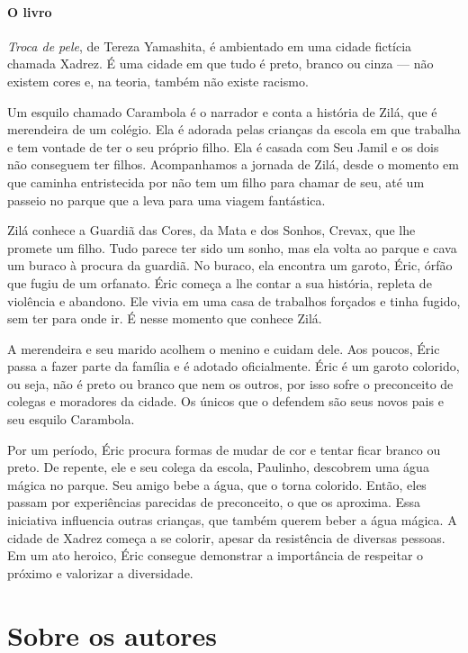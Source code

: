 \documentclass[11pt]{extarticle}
\begin{document}
\paragraph{O livro} \textit{Troca de pele}, de Tereza Yamashita, é ambientado em uma cidade fictícia chamada Xadrez. É uma cidade em que tudo é preto, branco ou cinza --- não existem cores e, na teoria, também não existe racismo. 

Um esquilo chamado Carambola é o narrador e conta a história de Zilá, que é merendeira de um colégio. Ela é adorada pelas crianças da escola em que trabalha e tem vontade de ter o seu próprio filho. Ela é casada com Seu Jamil e os dois não conseguem ter filhos.
Acompanhamos a jornada de Zilá, desde o momento em que caminha entristecida por não tem um filho para chamar de seu, até um passeio no parque que a leva para uma viagem fantástica. 

Zilá conhece a Guardiã das Cores, da Mata e dos Sonhos, Crevax, que lhe promete um filho. Tudo parece ter sido um sonho, mas ela volta ao parque e cava um buraco à procura da guardiã. No buraco, ela encontra um garoto, Éric, órfão que fugiu de um orfanato. Éric começa a lhe contar a sua história, repleta de violência e abandono. Ele vivia em uma casa de trabalhos forçados e tinha fugido, sem ter para onde ir. É nesse momento que conhece Zilá.

A merendeira e seu marido acolhem o menino e cuidam dele. Aos poucos, Éric passa a fazer parte da família e é adotado oficialmente. Éric é um garoto colorido, ou seja, não é preto ou branco que nem os outros, por isso sofre o preconceito de colegas e moradores da cidade. Os únicos que o defendem são seus novos pais e seu esquilo Carambola.

Por um período, Éric procura formas de mudar de cor e tentar ficar branco ou preto. De repente, ele e seu colega da escola, Paulinho, descobrem uma água mágica no parque. Seu amigo bebe a água, que o torna colorido. Então, eles passam por experiências parecidas de preconceito, o que os aproxima. Essa iniciativa influencia outras crianças, que também querem beber a água mágica. A cidade de Xadrez começa a se colorir, apesar da resistência de diversas pessoas. Em um ato heroico, Éric consegue demonstrar a importância de respeitar o próximo e valorizar a diversidade.

\section{Sobre os autores}
\end{document}
